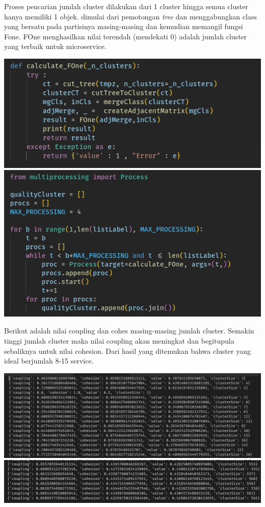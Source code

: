 Proses pencarian jumlah cluster dilakukan dari 1 cluster hingga semua cluster hanya memiliki 1 objek. dimulai dari pemotongan \textit{tree} dan menggabungkan class yang bersatu pada partisinya masing-masing dan kemudian memangil fungsi Fone. FOne menghasilkan nilai terendah (mendekati 0) adalah jumlah cluster yang terbaik untuk microservice.

\begin{center}
	\includegraphics[width=14cm]{img/bab_3/FOneMultiCore.png}
	\includegraphics[width=14cm]{img/bab_3/BruteForceSearch.png}
	\label{fig:asd}
\end{center}

Berikut adalah nilai coupling dan cohes masing-masing jumlah cluster. Semakin tinggi jumlah cluster maka nilai coupling akan meningkat dan begitupula sebaliknya untuk nilai cohesion. Dari hasil yang ditemukan bahwa cluster yang ideal berjumlah 8-15 service.

\begin{center}
	\includegraphics[width=14cm]{img/bab_3/ResGood.png}
	\includegraphics[width=14cm]{img/bab_3/ResBad.png}
	\label{fig:asd}
\end{center}

